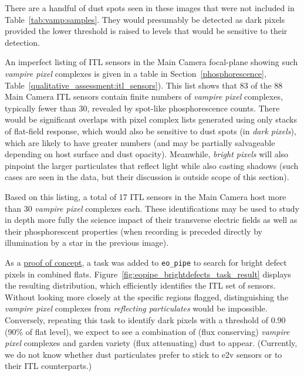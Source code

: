 There are a handful of dust spots seen in these images that were not included in Table~\ref{tab:vamp:samples}. They would presumably be detected as dark pixels provided the lower threshold is raised to levels that would be sensitive to their detection.


%
%

An imperfect listing of ITL sensors in the Main Camera focal-plane showing such {\it vampire pixel} complexes is given in a table in Section~\ref{phosphorescence}, Table~\ref{qualitative_assessment:itl_sensors}). This list shows that 83 of the 88 Main Camera ITL sensors contain finite numbers of {\it vampire pixel} complexes, typically fewer than 30, revealed by spot-like phosphorescence counts. There would be significant overlaps with pixel complex lists generated using only stacks of flat-field response, which would also be sensitive to dust spots (in {\it dark pixels}), which are likely to have greater numbers (and may be partially salvageable depending on host surface and dust opacity). Meanwhile, {\it bright pixels} will also pinpoint the larger particulates that reflect light while also casting shadows (such cases are seen in the data, but their discussion is outside scope of this section). 

Based on this listing, a total of 17 ITL sensors in the Main Camera host more than 30 {\it vampire pixel} complexes each. These identifications may be used to study in depth more fully the science impact of their transverse electric fields as well as their phosphorescent properties (when recording is preceded directly by illumination by a star in the previous image).

As a \href{https://rubin-obs.slack.com/archives/C07QJMQAP6E/p1731348605966989?thread_ts=1730921120.364949&cid=C07QJMQAP6E}{proof of concept}, a task was added to {\tt eo\_pipe} to search for bright defect pixels in combined flats. Figure~\ref{fig:eopipe_brightdefects_task_result} displays the resulting distribution, which efficiently identifies the ITL set of sensors. Without looking more closely at the specific regions flagged, distinguishing the {\it vampire pixel} complexes from {\it reflecting particulates} would be impossible. Conversely, repeating this task to identify dark pixels with a threshold of 0.90 (90\% of flat level), we expect to see a combination of (flux conserving) {\it vampire pixel} complexes and garden variety (flux attenuating) dust to appear. (Currently, we do not know whether dust particulates prefer to stick to e2v sensors or to their ITL counterparts.)

